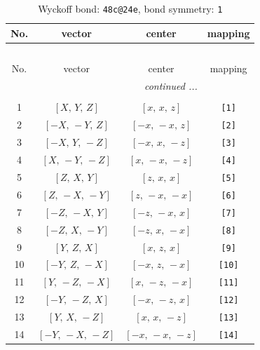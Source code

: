 \documentclass[fleqn,8pt]{jsarticle}
\begin{document}
\begin{longtable}{cccc}
\caption{Wyckoff bond: {\tt 48c@24e}, bond symmetry: {\tt 1}}
 \\
 \hline \hline
No. & vector & center & mapping \\ \hline \endfirsthead

\multicolumn{3}{l}{\tablename\ \thetable{}} \\
 \hline \hline
No. & vector & center & mapping \\ \hline \endhead

 \hline \hline
\multicolumn{3}{r}{\footnotesize\it continued ...} \\ \endfoot

 \hline \hline
\multicolumn{3}{r}{} \\ \endlastfoot

1 & $\left[ X,\, Y,\, Z \right]$ & $\left[ x,\, x,\, z \right]$ & {\tt [1]} \\ \hline
2 & $\left[ - X,\, - Y,\, Z \right]$ & $\left[ - x,\, - x,\, z \right]$ & {\tt [2]} \\ \hline
3 & $\left[ - X,\, Y,\, - Z \right]$ & $\left[ - x,\, x,\, - z \right]$ & {\tt [3]} \\ \hline
4 & $\left[ X,\, - Y,\, - Z \right]$ & $\left[ x,\, - x,\, - z \right]$ & {\tt [4]} \\ \hline
5 & $\left[ Z,\, X,\, Y \right]$ & $\left[ z,\, x,\, x \right]$ & {\tt [5]} \\ \hline
6 & $\left[ Z,\, - X,\, - Y \right]$ & $\left[ z,\, - x,\, - x \right]$ & {\tt [6]} \\ \hline
7 & $\left[ - Z,\, - X,\, Y \right]$ & $\left[ - z,\, - x,\, x \right]$ & {\tt [7]} \\ \hline
8 & $\left[ - Z,\, X,\, - Y \right]$ & $\left[ - z,\, x,\, - x \right]$ & {\tt [8]} \\ \hline
9 & $\left[ Y,\, Z,\, X \right]$ & $\left[ x,\, z,\, x \right]$ & {\tt [9]} \\ \hline
10 & $\left[ - Y,\, Z,\, - X \right]$ & $\left[ - x,\, z,\, - x \right]$ & {\tt [10]} \\ \hline
11 & $\left[ Y,\, - Z,\, - X \right]$ & $\left[ x,\, - z,\, - x \right]$ & {\tt [11]} \\ \hline
12 & $\left[ - Y,\, - Z,\, X \right]$ & $\left[ - x,\, - z,\, x \right]$ & {\tt [12]} \\ \hline
13 & $\left[ Y,\, X,\, - Z \right]$ & $\left[ x,\, x,\, - z \right]$ & {\tt [13]} \\ \hline
14 & $\left[ - Y,\, - X,\, - Z \right]$ & $\left[ - x,\, - x,\, - z \right]$ & {\tt [14]} \\ \hline

\end{longtable}
\end{document}
